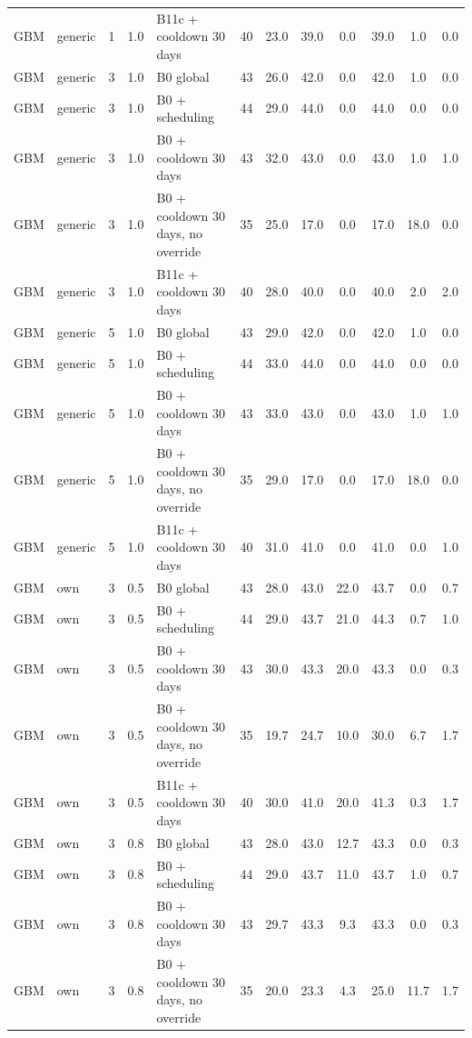 \documentclass[10pt,onecolumn,letterpaper]{article}
\begin{document}
\begin{longtable}{lllllccccccc}
GBM & generic & 1 & 1.0 & B11c + cooldown 30 days & 40 & 23.0 & 39.0 & 0.0 & 39.0 & 1.0 & 0.0 \\
GBM & generic & 3 & 1.0 & B0 global & 43 & 26.0 & 42.0 & 0.0 & 42.0 & 1.0 & 0.0 \\
GBM & generic & 3 & 1.0 & B0 + scheduling & 44 & 29.0 & 44.0 & 0.0 & 44.0 & 0.0 & 0.0 \\
GBM & generic & 3 & 1.0 & B0 + cooldown 30 days & 43 & 32.0 & 43.0 & 0.0 & 43.0 & 1.0 & 1.0 \\
GBM & generic & 3 & 1.0 & B0 + cooldown 30 days, no override & 35 & 25.0 & 17.0 & 0.0 & 17.0 & 18.0 & 0.0 \\
GBM & generic & 3 & 1.0 & B11c + cooldown 30 days & 40 & 28.0 & 40.0 & 0.0 & 40.0 & 2.0 & 2.0 \\
GBM & generic & 5 & 1.0 & B0 global & 43 & 29.0 & 42.0 & 0.0 & 42.0 & 1.0 & 0.0 \\
GBM & generic & 5 & 1.0 & B0 + scheduling & 44 & 33.0 & 44.0 & 0.0 & 44.0 & 0.0 & 0.0 \\
GBM & generic & 5 & 1.0 & B0 + cooldown 30 days & 43 & 33.0 & 43.0 & 0.0 & 43.0 & 1.0 & 1.0 \\
GBM & generic & 5 & 1.0 & B0 + cooldown 30 days, no override & 35 & 29.0 & 17.0 & 0.0 & 17.0 & 18.0 & 0.0 \\
GBM & generic & 5 & 1.0 & B11c + cooldown 30 days & 40 & 31.0 & 41.0 & 0.0 & 41.0 & 0.0 & 1.0 \\
GBM & own & 3 & 0.5 & B0 global & 43 & 28.0 & 43.0 & 22.0 & 43.7 & 0.0 & 0.7 \\
GBM & own & 3 & 0.5 & B0 + scheduling & 44 & 29.0 & 43.7 & 21.0 & 44.3 & 0.7 & 1.0 \\
GBM & own & 3 & 0.5 & B0 + cooldown 30 days & 43 & 30.0 & 43.3 & 20.0 & 43.3 & 0.0 & 0.3 \\
GBM & own & 3 & 0.5 & B0 + cooldown 30 days, no override & 35 & 19.7 & 24.7 & 10.0 & 30.0 & 6.7 & 1.7 \\
GBM & own & 3 & 0.5 & B11c + cooldown 30 days & 40 & 30.0 & 41.0 & 20.0 & 41.3 & 0.3 & 1.7 \\
GBM & own & 3 & 0.8 & B0 global & 43 & 28.0 & 43.0 & 12.7 & 43.3 & 0.0 & 0.3 \\
GBM & own & 3 & 0.8 & B0 + scheduling & 44 & 29.0 & 43.7 & 11.0 & 43.7 & 1.0 & 0.7 \\
GBM & own & 3 & 0.8 & B0 + cooldown 30 days & 43 & 29.7 & 43.3 & 9.3 & 43.3 & 0.0 & 0.3 \\
GBM & own & 3 & 0.8 & B0 + cooldown 30 days, no override & 35 & 20.0 & 23.3 & 4.3 & 25.0 & 11.7 & 1.7 \\

\end{longtable}
\end{document}
